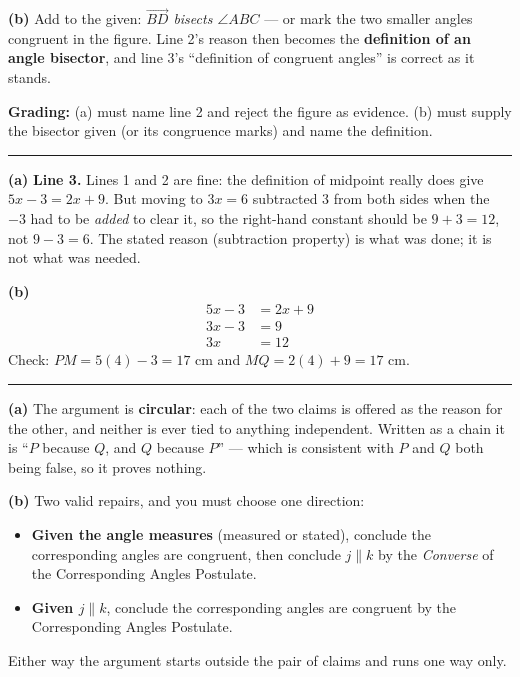\documentclass[12pt]{article}
\begin{document}
\textbf{(b)} Add to the given: \emph{$\overrightarrow{BD}$ bisects $\angle ABC$} --- or mark the two smaller angles congruent in the figure. Line 2's reason then becomes the \textbf{definition of an angle bisector}, and line 3's ``definition of congruent angles'' is correct as it stands.

\textbf{Grading:} (a) must name line 2 and reject the figure as evidence. (b) must supply the bisector given (or its congruence marks) and name the definition.

\vspace{0.2cm}\noindent\rule{\linewidth}{0.2pt}


\textbf{(a)} \textbf{Line 3.} Lines 1 and 2 are fine: the definition of midpoint really does give $5x - 3 = 2x + 9$. But moving to $3x = 6$ subtracted $3$ from both sides when the $-3$ had to be \emph{added} to clear it, so the right-hand constant should be $9 + 3 = 12$, not $9 - 3 = 6$. The stated reason (subtraction property) is what was done; it is not what was needed.

\textbf{(b)}
\begin{align*}
  5x - 3 &= 2x + 9 \\
  3x - 3 &= 9 \\
  3x &= 12
\end{align*}
Check: $PM = 5(4) - 3 = 17$ cm and $MQ = 2(4) + 9 = 17$ cm. 

\vspace{0.2cm}\noindent\rule{\linewidth}{0.2pt}


\textbf{(a)} The argument is \textbf{circular}: each of the two claims is offered as the reason for the other, and neither is ever tied to anything independent. Written as a chain it is ``$P$ because $Q$, and $Q$ because $P$'' --- which is consistent with $P$ and $Q$ both being false, so it proves nothing.

\textbf{(b)} Two valid repairs, and you must choose one direction:
\begin{itemize}[leftmargin=1.0cm, itemsep=1pt, topsep=2pt]
  \item \textbf{Given the angle measures} (measured or stated), conclude the corresponding angles are congruent, then conclude $j \parallel k$ by the \emph{Converse} of the Corresponding Angles Postulate.
  \item \textbf{Given $j \parallel k$}, conclude the corresponding angles are congruent by the Corresponding Angles Postulate.
\end{itemize}
Either way the argument starts outside the pair of claims and runs one way only.
\end{document}

